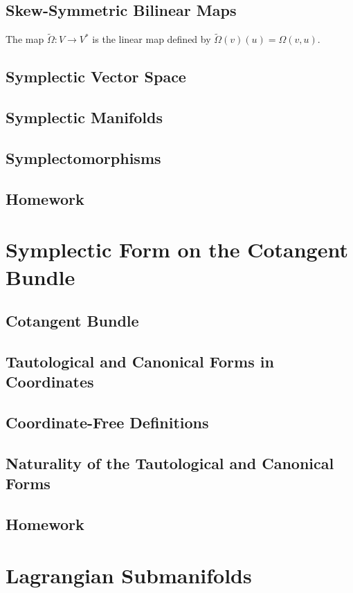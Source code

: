 \documentclass[4paper]{article}
\begin{document}
\subsection{Skew-Symmetric Bilinear Maps}
\begin{definition}
The map $\tilde{\Omega}:V\rightarrow V^*$ is the linear map defined by $\tilde{\Omega}(v)(u)=\Omega(v,u)$.
\end{definition}
\subsection{Symplectic Vector Space}
\subsection{Symplectic Manifolds}
\subsection{Symplectomorphisms}
\subsection{Homework}
\section{Symplectic Form on the Cotangent Bundle}
\subsection{Cotangent Bundle}
\subsection{Tautological and Canonical Forms in Coordinates}
\subsection{Coordinate-Free Definitions}
\subsection{Naturality of the Tautological and Canonical Forms}
\subsection{Homework} 
\section{Lagrangian Submanifolds}
\end{document}
